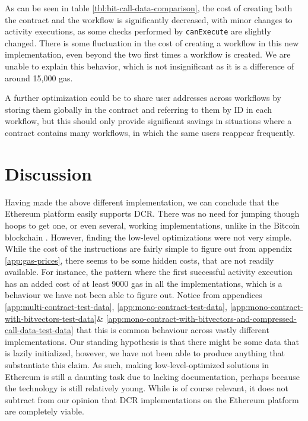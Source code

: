 \documentclass{article}
\begin{document}
		As can be seen in table \ref{tbl:bit-call-data-comparison}, the cost of creating both the contract and the workflow is significantly decreased, with minor changes to activity executions, as some checks performed by \texttt{canExecute} are slightly changed.
		There is some fluctuation in the cost of creating a workflow in this new implementation, even beyond the two first times a workflow is created.
		We are unable to explain this behavior, which is not insignificant as it is a difference of around 15,000 gas.

		A further optimization could be to share user addresses across workflows by storing them globally in the contract and referring to them by ID in each workflow, but this should only provide significant savings in situations where a contract contains many workflows, in which the same users reappear frequently.

	\section{Discussion}
	Having made the above different implementation, we can conclude that the Ethereum platform easily supports DCR.
	There was no need for jumping though hoops to get one, or even several, working implementations, unlike in the Bitcoin blockchain \cite{bachelor}.
	However, finding the low-level optimizations were not very simple.
	While the cost of the instructions are fairly simple to figure out from appendix \ref{app:gas-prices}, there seems to be some hidden costs, that are not readily available. 
	For instance, the pattern where the first successful activity execution has an added cost of at least 9000 gas in all the implementations, which is a behaviour we have not been able to figure out.
	Notice from appendices \ref{app:multi-contract-test-data}, \ref{app:mono-contract-test-data}, \ref{app:mono-contract-with-bitvectors-test-data}\& \ref{app:mono-contract-with-bitvectors-and-compressed-call-data-test-data} that this is common behaviour across vastly different implementations. 
	Our standing hypothesis is that there might be some data that is lazily initialized, however, we have not been able to produce anything that substantiate this claim.
	As such, making low-level-optimized solutions in Ethereum is still a daunting task due to lacking documentation, perhaps because the technology is still relatively young.
	While is of course relevant, it does not subtract from our opinion that DCR implementations on the Ethereum platform are completely viable.
\end{document}
